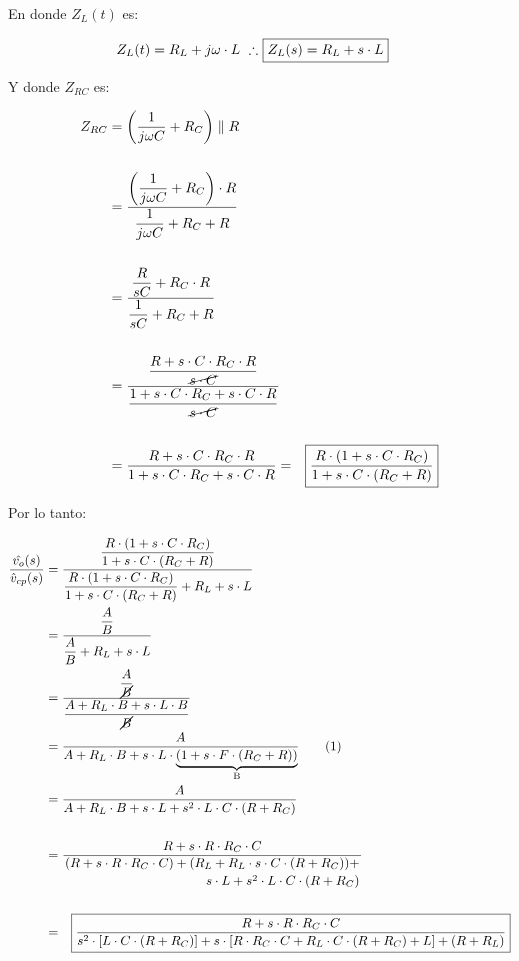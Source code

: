 \documentclass[12pt]{report}
\begin{document}
	En donde $Z_L(t)$ es:
	
	\begin{equation}
	\begin{aligned}
	Z_L(t) = R_L + j\omega \cdot L \ \therefore \ \Aboxed{Z_L(s) = R_L + s \cdot L}
	\end{aligned}
	\end{equation}
	
	Y donde $Z_{RC}$ es:
	
	\begin{equation}
	\begin{aligned}
	Z_{RC} 	&= \left(\dfrac{1}{j \omega C} + R_C \right) \parallel R \\ \\
			&= \dfrac{\left(\dfrac{1}{j \omega C} + R_C \right) \cdot R}{\dfrac{1}{j \omega C} + R_C + R} \\ \\
			&= \dfrac{\dfrac{R}{sC} + R_C \cdot R}{\dfrac{1}{sC} + R_C + R} \\ \\
			&= \dfrac{ \dfrac{R + s \cdot C \cdot R_C \cdot R}{\cancel{s \cdot C}} }{ \dfrac{1 + s \cdot C \cdot R_C + s \cdot C \cdot R}{\cancel{s \cdot C}} } \\ \\
			&= \dfrac{R + s \cdot C \cdot R_C \cdot R}{1 + s \cdot C \cdot R_C + s \cdot C \cdot R} = \Aboxed{\dfrac{R \cdot (1 + s \cdot C \cdot R_C)}{1 + s \cdot C \cdot (R_C + R)}}
	\end{aligned}
	\end{equation}
	
	Por lo tanto:
	
	\begin{align*}
	\dfrac{\hat{v_o}(s)}{\hat{v}_{cp}(s)} &= \dfrac{\dfrac{R \cdot (1 + s \cdot C \cdot R_C)}{1 + s \cdot C \cdot (R_C + R)}}{ \dfrac{R \cdot (1 + s \cdot C \cdot R_C)}{1 + s \cdot C \cdot (R_C + R)} + R_L + s \cdot L } \\
	&= \dfrac{\dfrac{A}{B}}{\dfrac{A}{B} + R_L + s \cdot L} \\
	&= \dfrac{\dfrac{A}{\cancel{B}}}{\dfrac{A + R_L \cdot B + s \cdot L \cdot B}{\cancel{B}}} \\
	&= \dfrac{A}{A + R_L \cdot B + s \cdot L \cdot \underbrace{(1 + s \cdot F \cdot (R_C + R))}_\text{B}} \tag{\stepcounter{equation}\theequation} \\
	&= \dfrac{A}{A + R_L \cdot B + s \cdot L + s^2 \cdot L \cdot C \cdot (R + R_C)} \\ \\
	&= \dfrac{R + s \cdot R \cdot R_C \cdot C}{\displaystyle{(R + s \cdot R \cdot R_C \cdot C) + (R_L + R_L \cdot s \cdot C \cdot (R + R_C)) + \atop \hfill s \cdot L + s^2 \cdot L \cdot C \cdot (R + R_C)}} \\ \\
	&= \Aboxed{\dfrac{R + s \cdot R \cdot R_C \cdot C}{s^2 \cdot [L \cdot C \cdot (R + R_C)] + s \cdot [R \cdot R_C \cdot C + R_L \cdot C \cdot (R + R_C) + L] + (R + R_L)}}
	\end{align*}
	
\end{document}
